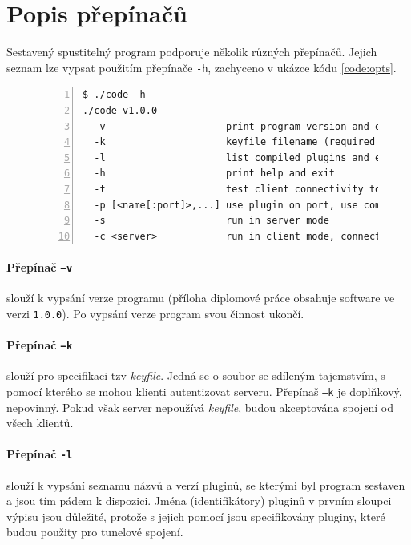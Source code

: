 \documentclass[thesis=M,czech]{FITthesis}[2012/10/20]
\begin{document}
    \section{Popis přepínačů}
    
    Sestavený spustitelný program podporuje několik různých přepínačů. Jejich seznam lze vypsat použitím přepínače \texttt{-h}, zachyceno v ukázce kódu \ref{code:opts}.
    
    \begin{figure}[t]
	\begin{lstlisting}[label=code:opts,caption=Výpis podporovaných přepínačů aplikace,frame=single,numbers=left]
$ ./code -h
./code v1.0.0
  -v                     print program version and exit
  -k                     keyfile filename (required for auth)
  -l                     list compiled plugins and exit
  -h                     print help and exit
  -t                     test client connectivity to server and exit
  -p [<name[:port]>,...] use plugin on port, use comma to specify more plugins
  -s                     run in server mode
  -c <server>            run in client mode, connect to server ip/hostname
      \end{lstlisting}
    \end{figure}

    
    \paragraph{Přepínač \texttt{--v}} slouží k vypsání verze programu (příloha diplomové práce obsahuje software ve verzi \texttt{1.0.0}). Po vypsání verze program svou činnost ukončí.
    
    \paragraph{Přepínač \texttt{--k}} slouží pro specifikaci tzv \textit{keyfile}. Jedná se o soubor se sdíleným tajemstvím, s pomocí kterého se mohou klienti autentizovat serveru. Přepínaš \texttt{--k} je doplňkový, nepovinný. Pokud však server nepoužívá \textit{keyfile}, budou akceptována spojení od všech klientů.
    
    \paragraph{Přepínač \texttt{-l}} slouží k vypsání seznamu názvů a verzí pluginů, se kterými byl program sestaven a jsou tím pádem k dispozici. Jména (identifikátory) pluginů v prvním sloupci výpisu jsou důležité, protože s jejich pomocí jsou specifikovány pluginy, které budou použity pro tunelové spojení.
\end{document}
